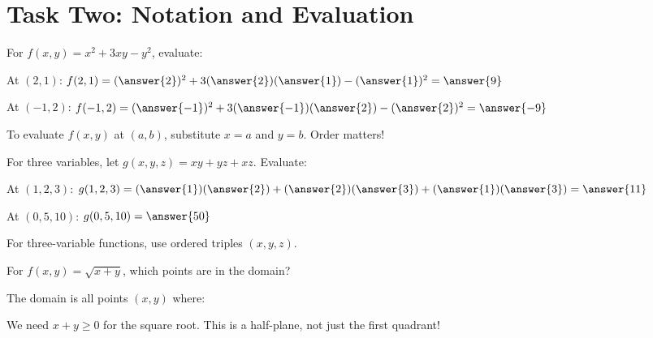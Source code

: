 \documentclass{ximera}
\begin{document}
\section*{Task Two: Notation and Evaluation}

\begin{problem}
For $f(x, y) = x^2 + 3xy - y^2$, evaluate:

At $(2, 1)$: $f(2, 1) = (\answer{2})^2 + 3(\answer{2})(\answer{1}) - (\answer{1})^2 = \answer{9}$

At $(-1, 2)$: $f(-1, 2) = (\answer{-1})^2 + 3(\answer{-1})(\answer{2}) - (\answer{2})^2 = \answer{-9}$

\begin{feedback}
To evaluate $f(x,y)$ at $(a,b)$, substitute $x=a$ and $y=b$. Order matters!
\end{feedback}
\end{problem}

\begin{problem}
For three variables, let $g(x, y, z) = xy + yz + xz$. Evaluate:

At $(1, 2, 3)$: $g(1, 2, 3) = (\answer{1})(\answer{2}) + (\answer{2})(\answer{3}) + (\answer{1})(\answer{3}) = \answer{11}$

At $(0, 5, 10)$: $g(0, 5, 10) = \answer{50}$

\begin{feedback}
For three-variable functions, use ordered triples $(x, y, z)$.
\end{feedback}
\end{problem}

\begin{problem}
For $f(x, y) = \sqrt{x + y}$, which points are in the domain?

\begin{selectAll}
\end{selectAll}

The domain is all points $(x, y)$ where:
\begin{multipleChoice}
\end{multipleChoice}

\begin{feedback}
We need $x + y \geq 0$ for the square root. This is a half-plane, not just the first quadrant!
\end{feedback}
\end{problem}
\end{document}
